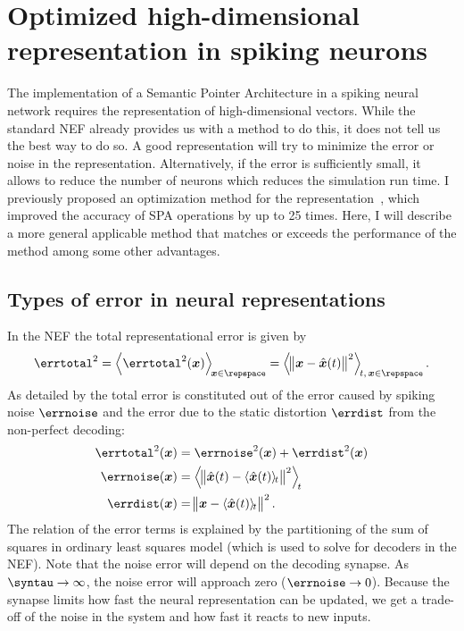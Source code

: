 \chapter{Optimized high-dimensional representation in spiking neurons}
The implementation of a Semantic Pointer Architecture in a spiking neural network requires the representation of high-dimensional vectors.
While the standard NEF already provides us with a method to do this, it does not tell us the best way to do so.
A good representation will try to minimize the error or noise in the representation.
Alternatively, if the error is sufficiently small, it allows to reduce the number of neurons which reduces the simulation run time.
I previously proposed an optimization method for the representation~\parencite{gosmann216}, which improved the accuracy of SPA operations by up to 25 times.
Here, I will describe a more general applicable method that matches or exceeds the performance of the method among some other advantages.

\section{Types of error in neural representations}
In the NEF the total representational error is given by
\begin{equation}
    \errtotal^2 = \left\langle \errtotal^2(\vc x) \right\rangle_{\!\vc x \in \repspace} = \left\langle \norm{\vc x - \hat{\vc x}(t)}^2 \right\rangle_{\!t,\,\vc x \in \repspace} \text{.}
\end{equation}
As detailed by \textcite[47--48]{eliasmith2003} the total error is constituted out of the error caused by spiking noise $\errnoise$ and the error due to the static distortion $\errdist$ from the non-perfect decoding:
\begin{align}
    \errtotal^2(\vc x) &= \errnoise^2(\vc x) + \errdist^2(\vc x) \\
    \errnoise(\vc x) &= \left\langle \norm{\hat{\vc x}(t) - \langle \hat{\vc x}(t) \rangle_{\!t}}^2 \right\rangle_{\!t} \\
    \errdist(\vc x) &= \norm{\vc x - \langle \hat{\vc x}(t) \rangle_{\!t}}^2 \text{.}
\end{align}
The relation of the error terms is explained by the partitioning of the sum of squares in ordinary least squares model (which is used to solve for decoders in the NEF).
Note that the noise error will depend on the decoding synapse.
As $\syntau \rightarrow \infty$, the noise error will approach zero ($\errnoise \rightarrow 0$).
Because the synapse limits how fast the neural representation can be updated, we get a trade-off of the noise in the system and how fast it reacts to new inputs.

